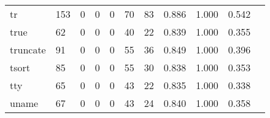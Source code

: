 \begin{longtable}{lp{1.2cm}p{1.2cm}p{1.2cm}p{1.2cm}p{1.2cm}p{1.2cm}p{1.2cm}p{1.2cm}p{1.2cm}p{1.2cm}}
tr        &                                   153 &                                                  0 &                                                  0 &                                                  0 &                                                 70 &                                                 83 &                                              0.886 &                                              1.000 &                                              0.542 \\
true      &                                    62 &                                                  0 &                                                  0 &                                                  0 &                                                 40 &                                                 22 &                                              0.839 &                                              1.000 &                                              0.355 \\
truncate  &                                    91 &                                                  0 &                                                  0 &                                                  0 &                                                 55 &                                                 36 &                                              0.849 &                                              1.000 &                                              0.396 \\
tsort     &                                    85 &                                                  0 &                                                  0 &                                                  0 &                                                 55 &                                                 30 &                                              0.838 &                                              1.000 &                                              0.353 \\
tty       &                                    65 &                                                  0 &                                                  0 &                                                  0 &                                                 43 &                                                 22 &                                              0.835 &                                              1.000 &                                              0.338 \\
uname     &                                    67 &                                                  0 &                                                  0 &                                                  0 &                                                 43 &                                                 24 &                                              0.840 &                                              1.000 &                                              0.358 \\

\end{longtable}
